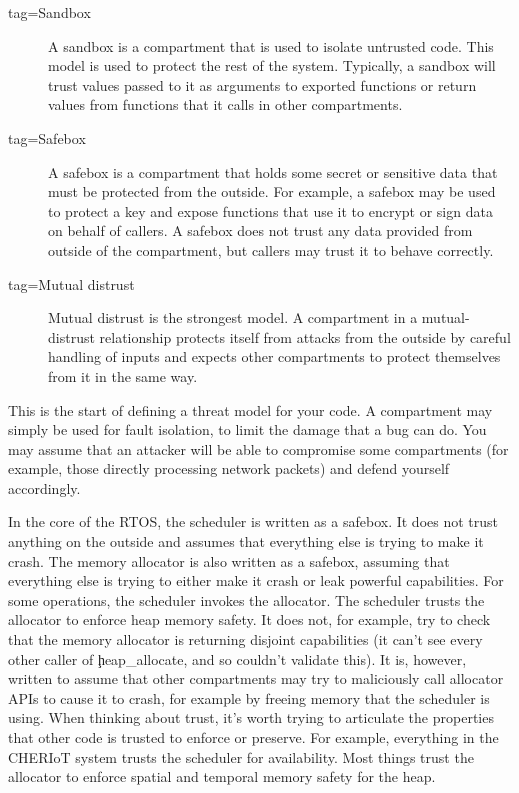 \begin{description}
	\item[tag=Sandbox]{ A sandbox is a compartment that is used to isolate
		untrusted code.
		This model is used to protect the rest of the system.
		Typically, a sandbox will trust values passed to it as arguments to exported functions or return values from functions that it calls in other compartments.}
		\item[tag=Safebox]{ A safebox is a compartment that holds some secret or sensitive data that must be protected from the outside.
		For example, a safebox may be used to protect a key and expose functions that use it to encrypt or sign data on behalf of callers.
		A safebox does not trust any data provided from outside of the compartment, but callers may trust it to behave correctly.}
	\item[tag=Mutual distrust]{ Mutual distrust is the strongest model.
		A compartment in a mutual-distrust relationship protects itself from attacks from the outside by careful handling of inputs and expects other compartments to protect themselves from it in the same way.}
\end{description}

This is the start of defining a threat model for your code.
A compartment may simply be used for fault isolation, to limit the damage that a bug can do.
You may assume that an attacker will be able to compromise some compartments (for example, those directly processing network packets) and defend yourself accordingly.

In the core of the RTOS, the scheduler is written as a safebox.
It does not trust anything on the outside and assumes that everything else is trying to make it crash.
The memory allocator is also written as a safebox, assuming that everything else is trying to either make it crash or leak powerful capabilities.
For some operations, the scheduler invokes the allocator.
The scheduler trusts the allocator to enforce heap memory safety.
It does not, for example, try to check that the memory allocator is returning disjoint capabilities (it can't see every other caller of \c{heap_allocate}, and so couldn't validate this).
It is, however, written to assume that other compartments may try to maliciously call allocator APIs to cause it to crash, for example by freeing memory that the scheduler is using.
When thinking about trust, it's worth trying to articulate the properties that other code is trusted to enforce or preserve.
For example, everything in the CHERIoT system trusts the scheduler for availability.
Most things trust the allocator to enforce spatial and temporal memory safety for the heap.

